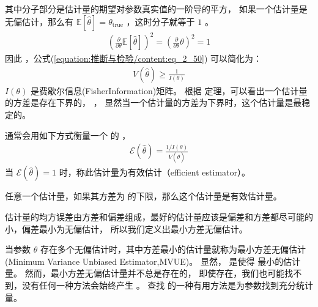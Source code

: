 \documentclass[letterpaper,10pt,english]{sphinxmanual}
\begin{document}
其中分子部分是估计量的期望对参数真实值的一阶导的平方，
如果一个估计量是无偏估计，那么有 \(\mathbb{E}[\hat{\theta}]=\theta_{\text{true}}\)
，这时分子就等于 \(1\) 。
\begin{equation}\label{equation:推断与检验/content:推断与检验/content:50}
\begin{split}(\frac{\partial}{\partial \theta} \mathbb{E}[\hat{\theta}] )^2
= ( \frac{\partial}{\partial \theta}  \theta)^2
= 1\end{split}
\end{equation}
因此 ，公式(\ref{equation:推断与检验/content:eq_2_50}) 可以简化为：
\begin{equation}\label{equation:推断与检验/content:推断与检验/content:51}
\begin{split}V(\hat{\theta}) \ge \frac{1}{I(\theta)}\end{split}
\end{equation}
\(I(\theta)\) 是费歇尔信息(Fisher\sphinxhyphen{}Information)矩阵。
根据  定理，可以看出一个估计量的方差是存在下界的，
，
显然当一个估计量的方差为下界时，这个估计量是最稳定的。

通常会用如下方式衡量一个  的 ，
\begin{equation}\label{equation:推断与检验/content:推断与检验/content:52}
\begin{split}\mathcal{E}(\hat{\theta}) = \frac{1/I(\theta)}{V(\hat{\theta})}\end{split}
\end{equation}
当 \(\mathcal{E}(\hat{\theta})=1\) 时，称此估计量为有效估计（efficient estimator）。

\begin{sphinxShadowBox}

任意一个估计量，如果其方差为  的下限，那么这个估计量是有效估计量。
\end{sphinxShadowBox}

估计量的均方误差由方差和偏差组成，最好的估计量应该是偏差和方差都尽可能的小，偏差最小为无偏估计，
所以我们定义出最小方差无偏估计。

\begin{sphinxShadowBox}

当参数 \(\theta\) 存在多个无偏估计时，其中方差最小的估计量就称为最小方差无偏估计
(Minimum Variance Unbiased Estimator,MVUE)。
显然， 是使得  最小的估计量。
然而，最小方差无偏估计量并不总是存在的，
即使存在，我们也可能找不到，没有任何一种方法会始终产生  。
查找  的一种有用方法是为参数找到充分统计量。
\end{sphinxShadowBox}
\end{document}
